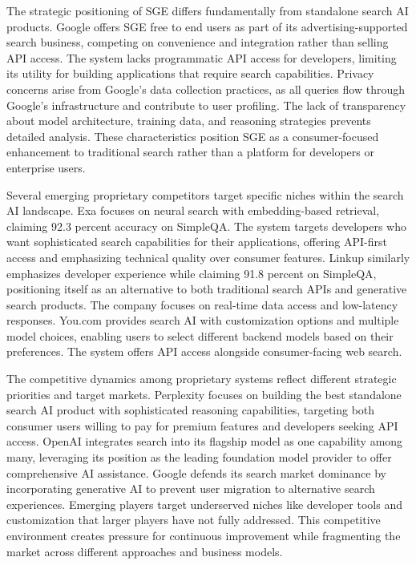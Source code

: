 The strategic positioning of SGE differs fundamentally from standalone search AI products. Google offers SGE free to end users as part of its advertising-supported search business, competing on convenience and integration rather than selling API access. The system lacks programmatic API access for developers, limiting its utility for building applications that require search capabilities. Privacy concerns arise from Google's data collection practices, as all queries flow through Google's infrastructure and contribute to user profiling. The lack of transparency about model architecture, training data, and reasoning strategies prevents detailed analysis. These characteristics position SGE as a consumer-focused enhancement to traditional search rather than a platform for developers or enterprise users.

Several emerging proprietary competitors target specific niches within the search AI landscape. Exa focuses on neural search with embedding-based retrieval, claiming 92.3 percent accuracy on SimpleQA. The system targets developers who want sophisticated search capabilities for their applications, offering API-first access and emphasizing technical quality over consumer features. Linkup similarly emphasizes developer experience while claiming 91.8 percent on SimpleQA, positioning itself as an alternative to both traditional search APIs and generative search products. The company focuses on real-time data access and low-latency responses. You.com provides search AI with customization options and multiple model choices, enabling users to select different backend models based on their preferences. The system offers API access alongside consumer-facing web search.

The competitive dynamics among proprietary systems reflect different strategic priorities and target markets. Perplexity focuses on building the best standalone search AI product with sophisticated reasoning capabilities, targeting both consumer users willing to pay for premium features and developers seeking API access. OpenAI integrates search into its flagship model as one capability among many, leveraging its position as the leading foundation model provider to offer comprehensive AI assistance. Google defends its search market dominance by incorporating generative AI to prevent user migration to alternative search experiences. Emerging players target underserved niches like developer tools and customization that larger players have not fully addressed. This competitive environment creates pressure for continuous improvement while fragmenting the market across different approaches and business models.

